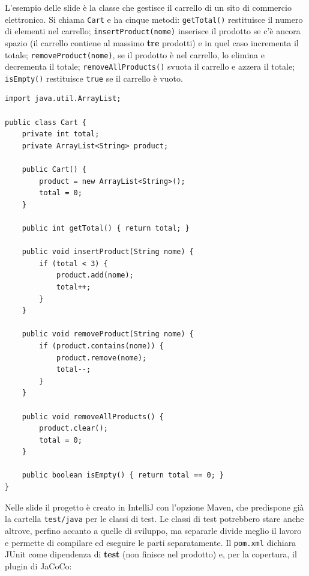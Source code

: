 L'esempio delle slide è la classe che gestisce il carrello di un sito di commercio elettronico. Si chiama
\texttt{Cart} e ha cinque metodi: \texttt{getTotal()} restituisce il numero di elementi nel carrello;
\texttt{insertProduct(nome)} inserisce il prodotto se c'è ancora spazio (il carrello contiene al massimo
\textbf{tre} prodotti) e in quel caso incrementa il totale; \texttt{removeProduct(nome)}, se il prodotto è nel carrello,
lo elimina e decrementa il totale; \texttt{removeAllProducts()} svuota il carrello e azzera il totale;
\texttt{isEmpty()} restituisce \texttt{true} se il carrello è vuoto.

\begin{lstlisting}[style=java, name=Cart.java]
import java.util.ArrayList;

public class Cart {
    private int total;
    private ArrayList<String> product;

    public Cart() {
        product = new ArrayList<String>();
        total = 0;
    }

    public int getTotal() { return total; }

    public void insertProduct(String nome) {
        if (total < 3) {
            product.add(nome);
            total++;
        }
    }

    public void removeProduct(String nome) {
        if (product.contains(nome)) {
            product.remove(nome);
            total--;
        }
    }

    public void removeAllProducts() {
        product.clear();
        total = 0;
    }

    public boolean isEmpty() { return total == 0; }
}
\end{lstlisting}

Nelle slide il progetto è creato in IntelliJ con l'opzione Maven, che predispone già la cartella \texttt{test/java} per
le classi di test. Le classi di test potrebbero stare anche altrove, perfino accanto a quelle di sviluppo, ma separarle
divide meglio il lavoro e permette di compilare ed eseguire le parti separatamente. Il \texttt{pom.xml} dichiara JUnit
come dipendenza di \textbf{test} (non finisce nel prodotto) e, per la copertura, il plugin di JaCoCo:

